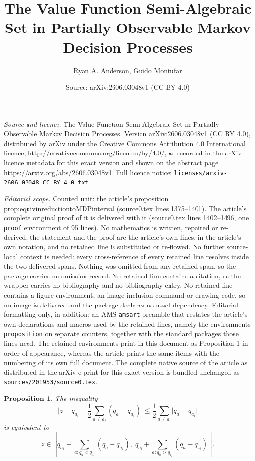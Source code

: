 \documentclass[10pt,a4paper]{amsart}
\title{The Value Function Semi-Algebraic Set in Partially Observable Markov Decision Processes}
\author{Ryan A. Anderson, Guido Montufar}
\date{Source: arXiv:2606.03048v1 (CC BY 4.0)}
\newtheorem{proposition}{Proposition}
\begin{document}
\maketitle

\noindent\emph{Source and licence.} The Value Function Semi-Algebraic Set in Partially Observable Markov Decision Processes. Version arXiv:2606.03048v1 (CC BY 4.0), distributed by arXiv under the Creative Commons Attribution 4.0 International licence, http://creativecommons.org/licenses/by/4.0/, as recorded in the arXiv licence metadata for this exact version and shown on the abstract page https://arxiv.org/abs/2606.03048v1. Full licence notice: \texttt{licenses/arxiv-2606.03048-CC-BY-4.0.txt}.\par\smallskip

\noindent\textit{Editorial scope.} Counted unit: the article's proposition prop:equivinreductiontoMDPinterval (source0.tex lines 1375--1401). The article's complete original proof of it is delivered with it (source0.tex lines 1402--1496, one \texttt{proof} environment of 95 lines). No mathematics is written, repaired or re-derived: the statement and the proof are the article's own lines, in the article's own notation, and no retained line is substituted or re-flowed.  No further source-local context is needed: every cross-reference of every retained line resolves inside the two delivered spans.  Nothing was omitted from any retained span, so the package carries no omission record.  No retained line contains a citation, so the wrapper carries no bibliography and no bibliography entry.  No retained line contains a figure environment, an image-inclusion command or drawing code, so no image is delivered and the package declares no asset dependency.  Editorial formatting only, in addition: an AMS \texttt{amsart} preamble that restates the article's own declarations and macros used by the retained lines, namely the environments \texttt{proposition} on separate counters, together with the standard packages those lines need.  The retained environments print in this document as Proposition 1 in order of appearance, whereas the article prints the same items with the numbering of its own full document.  The complete native source of the article as distributed in the arXiv e-print for this exact version is bundled unchanged as \texttt{sources/201953/source0.tex}.
\begin{proposition}
\label{prop:equivinreductiontoMDPinterval}
The inequality  
\[
    \lvert
        z-q_{a_i}
        -
        \frac12\sum_{a\neq a_i}(q_a-q_{a_i})
    \rvert
    \le
    \frac12\sum_{a\neq a_i}\vert q_a-q_{a_i}\vert  
\]
is equivalent to 
\[
    z
    \in
    \left[
        q_{a_i}
        +
        \sum_{a:q_a<q_{a_i}}(q_a-q_{a_i}),
        \;
        q_{a_i}
        +
        \sum_{a:q_a>q_{a_i}}(q_a-q_{a_i})
    \right].
\]
\end{proposition}
\end{document}
